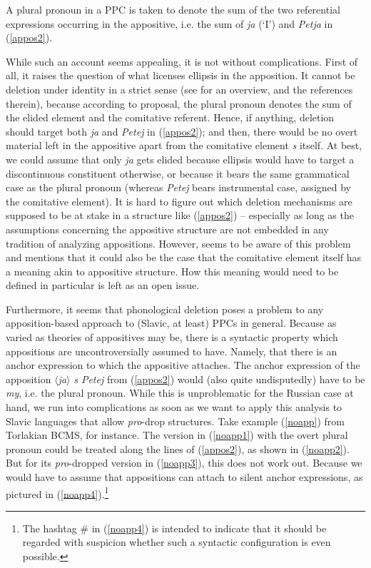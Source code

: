 \documentclass[output=paper,colorlinks,citecolor=brown]{langscibook}
\begin{document}
\noindent A plural pronoun in a PPC is taken to denote the sum of the two referential expressions occurring in the appositive, i.e. the sum of \textit{ja} (`I') and \textit{Petja} in (\ref{appos2}).


While such an account seems appealing, it is not without complications. First of all, it raises the question of what licenses ellipsis in the apposition. It cannot be deletion under identity in a strict sense (see \cite{Liptak2015} for an overview, and the references therein), because according to  proposal, the plural pronoun denotes the sum of the elided element and the comitative referent. Hence, if anything, deletion should target both \textit{ja} and \textit{Petej} in (\ref{appos2}); and then, there would be no overt material left in the appositive apart from the comitative element \textit{s} itself. At best, we could assume that only \textit{ja} gets elided because ellipsis would have to target a discontinuous constituent otherwise, or because it bears the same grammatical case as the plural pronoun (whereas \textit{Petej} bears instrumental case, assigned by the comitative element). It is hard to figure out which deletion mechanisms are supposed to be at stake in a structure like (\ref{appos2}) -- especially as long as the assumptions concerning the appositive structure are not embedded in any tradition of analyzing appositions. However, \citet{Cable2017} seems to be aware of this problem and mentions that it could also be the case that the comitative element itself has a meaning akin to appositive structure. How this meaning would need to be defined in particular is left as an open issue. 

Furthermore, it seems that phonological deletion poses a problem to any ap\-po\-si\-tion-based approach to (Slavic, at least) PPCs in general. Because as varied as theories of appositives may be, there is a syntactic property which appositions are uncontroversially assumed to have. Namely, that there is an anchor expression to which the appositive attaches. The anchor expression of the apposition $\langle$\textit{ja}$\rangle$ \textit{s Petej} from (\ref{appos2}) would (also quite undisputedly) have to be \textit{my}, i.e. the plural pronoun. While this is unproblematic for the Russian case at hand, we run into complications as soon as we want to apply this analysis to Slavic languages that allow \textit{pro}-drop structures. Take example (\ref{noapp}) from Torlakian BCMS, for instance. The version in (\ref{noapp1}) with the overt plural pronoun could be treated along the lines of (\ref{appos2}), as shown in (\ref{noapp2}). But for its \textit{pro}-dropped version in (\ref{noapp3}), this does not work out. Because we would have to assume that appositions can attach to silent anchor expressions, as pictured in (\ref{noapp4}).\footnote{The hashtag \# in (\ref{noapp4}) is intended to indicate that it should be regarded with suspicion whether such a syntactic configuration is even possible.}
\end{document}
